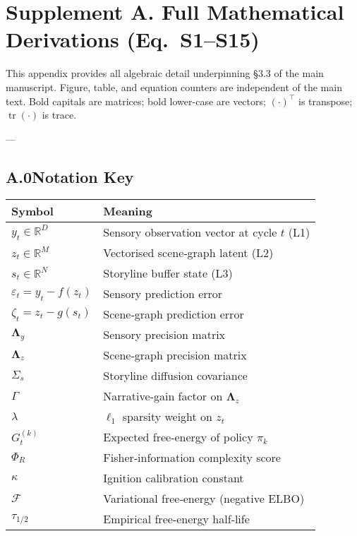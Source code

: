 \documentclass[12pt]{article}
\begin{document}



\section*{Supplement A. Full Mathematical Derivations (Eq.~S1--S15)}
\label{suppA}

This appendix provides all algebraic detail underpinning \S3.3 of the main manuscript. Figure, table, and equation counters are independent of the main text.  Bold capitals are matrices; bold lower-case are vectors; $(\cdot)^\top$ is transpose; $\operatorname{tr}(\cdot)$ is trace.

---
\subsection*{A.0\quad Notation Key}
\begin{center}
\begin{tabular}{@{}ll@{}}
\toprule
Symbol & Meaning \\
\midrule
$y_t \in \mathbb R^{D}$ & Sensory observation vector at cycle $t$ (L1) \\
$z_t \in \mathbb R^{M}$ & Vectorised scene‑graph latent (L2) \\
$s_t \in \mathbb R^{N}$ & Storyline buffer state (L3) \\
$\varepsilon_t=y_t-f(z_t)$ & Sensory prediction error \\
$\zeta_t=z_t-g(s_t)$ & Scene‑graph prediction error \\
$\boldsymbol\Lambda_y$ & Sensory precision matrix \\
$\boldsymbol\Lambda_z$ & Scene‑graph precision matrix \\
$\Sigma_s$ & Storyline diffusion covariance \\
$\Gamma$ & Narrative‑gain factor on $\boldsymbol\Lambda_z$ \\
$\lambda$ & $\ell_1$ sparsity weight on $z_t$ \\
$G_t^{(k)}$ & Expected free‑energy of policy $\pi_k$ \\
$\Phi_R$ & Fisher‑information complexity score \\
$\kappa$ & Ignition calibration constant \\
$\mathcal F$ & Variational free‑energy (negative ELBO) \\
$\tau_{1/2}$ & Empirical free‑energy half‑life \\
\bottomrule
\end{tabular}
\end{center}
\end{document}
